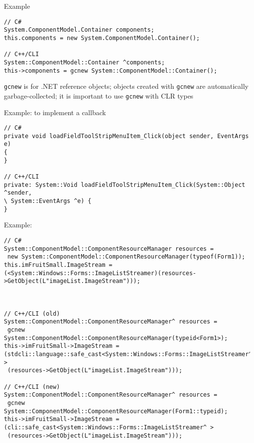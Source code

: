 Example
\begin{verbatim}
// C#
System.ComponentModel.Container components;
this.components = new System.ComponentModel.Container();

// C++/CLI
System::ComponentModel::Container ^components;
this->components = gcnew System::ComponentModel::Container();

\end{verbatim}
\verb!gcnew! is for .NET reference objects; objects created with \verb!gcnew!
are automatically garbage-collected; it is important to use \verb!gcnew! with
CLR types

Example: to implement a callback
\begin{verbatim}
// C#
private void loadFieldToolStripMenuItem_Click(object sender, EventArgs e)
{
}

// C++/CLI
private: System::Void loadFieldToolStripMenuItem_Click(System::Object ^sender,
\ System::EventArgs ^e) {
}

\end{verbatim}

Example: 
\begin{verbatim}
// C#
System::ComponentModel::ComponentResourceManager resources =
 new System::ComponentModel::ComponentResourceManager(typeof(Form1));
this.imFruitSmall.ImageStream = 
(<System::Windows::Forms::ImageListStreamer)(resources->GetObject(L"imageList.ImageStream")));



// C++/CLI (old)
System::ComponentModel::ComponentResourceManager^ resources =
 gcnew System::ComponentModel::ComponentResourceManager(typeid<Form1>);
this->imFruitSmall->ImageStream = 
(stdcli::language::safe_cast<System::Windows::Forms::ImageListStreamer^ >
 (resources->GetObject(L"imageList.ImageStream")));

// C++/CLI (new)
System::ComponentModel::ComponentResourceManager^ resources =
 gcnew System::ComponentModel::ComponentResourceManager(Form1::typeid);
this->imFruitSmall->ImageStream = 
(cli::safe_cast<System::Windows::Forms::ImageListStreamer^ >
 (resources->GetObject(L"imageList.ImageStream")));

\end{verbatim}

